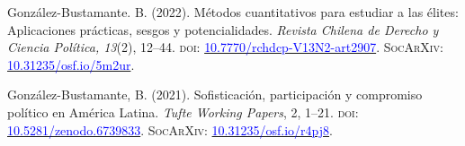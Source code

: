 \begin{publications}

\begin{benumerate}{14}


\item{\small González-Bustamante. B. (2022). Métodos cuantitativos para estudiar a las élites: Aplicaciones prácticas, sesgos y potencialidades. {\itshape Revista Chilena de Derecho y Ciencia Política, 13}(2), 12--44. {\scshape doi:} \href{https://doi.org/10.7770/rchdcp-V13N2-art2907}{\textcolor{blue}{10.7770/rchdcp-V13N2-art2907}}. {\scshape \footnotesize SocArXiv:} \href{https://doi.org/10.31235/osf.io/5m2ur}{\textcolor{blue}{10.31235/osf.io/5m2ur}}.}\vspace{1mm}


\item{\small González-Bustamante, B. (2021). Sofisticación, participación y compromiso político en América Latina. {\itshape Tufte Working Papers}, 2, 1--21. {\scshape doi:} \href{https://doi.org/10.5281/zenodo.6739833}{\textcolor{blue}{10.5281/zenodo.6739833}}. {\scshape \footnotesize SocArXiv:} \href{https://doi.org/10.31235/osf.io/r4pj8}{\textcolor{blue}{10.31235/osf.io/r4pj8}}.}\vspace{1mm}



\end{benumerate}
\end{publications}
